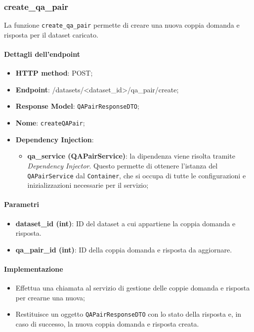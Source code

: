 \subsubsection{create\_qa\_pair}
La funzione \texttt{create\_qa\_pair} permette di creare una nuova coppia domanda e risposta per il dataset caricato.
\paragraph{Dettagli dell'endpoint}
\begin{itemize}
    \item \textbf{HTTP method}: POST;
    \item \textbf{Endpoint}: /datasets/\textless dataset\_id\textgreater/qa\_pair/create;
    \item \textbf{Response Model}: \texttt{QAPairResponseDTO};
    \item \textbf{Nome}: \texttt{createQAPair};
    \item \textbf{Dependency Injection}: 
    \begin{itemize}
        \item \textbf{qa\_service (QAPairService)}: la dipendenza viene risolta tramite \textit{Dependency Injector}. Questo permette di ottenere l'istanza del \texttt{QAPairService} dal \texttt{Container}, che si occupa di tutte le configurazioni e inizializzazioni necessarie per il servizio;
    \end{itemize}
\end{itemize}

\paragraph{Parametri}
\begin{itemize}
    \item \textbf{dataset\_id (int)}: ID del dataset a cui appartiene la coppia domanda e risposta.
    \item \textbf{qa\_pair\_id (int)}: ID della coppia domanda e risposta da aggiornare.
\end{itemize}

\paragraph{Implementazione}
\begin{itemize}
    \item Effettua una chiamata al servizio di gestione delle coppie domanda e risposta per crearne una nuova;
    \item Restituisce un oggetto \texttt{QAPairResponseDTO} con lo stato della risposta e, in caso di successo, la nuova coppia domanda e risposta creata.
\end{itemize}

